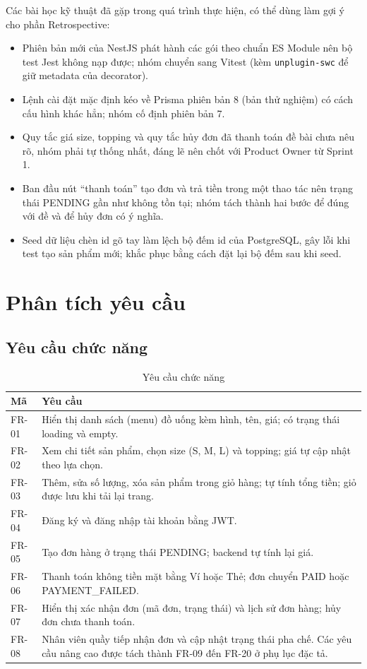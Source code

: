 \documentclass[a4paper]{article}
\begin{document}
Các bài học kỹ thuật đã gặp trong quá trình thực hiện, có thể dùng làm gợi ý cho phần Retrospective:
\begin{itemize}
	\item Phiên bản mới của NestJS phát hành các gói theo chuẩn ES Module nên bộ test Jest không nạp được; nhóm chuyển sang Vitest (kèm \texttt{unplugin-swc} để giữ metadata của decorator).
	\item Lệnh cài đặt mặc định kéo về Prisma phiên bản 8 (bản thử nghiệm) có cách cấu hình khác hẳn; nhóm cố định phiên bản 7.
	\item Quy tắc giá size, topping và quy tắc hủy đơn đã thanh toán đề bài chưa nêu rõ, nhóm phải tự thống nhất, đáng lẽ nên chốt với Product Owner từ Sprint 1.
	\item Ban đầu nút ``thanh toán'' tạo đơn và trả tiền trong một thao tác nên trạng thái PENDING gần như không tồn tại; nhóm tách thành hai bước để đúng với đề và để hủy đơn có ý nghĩa.
	\item Seed dữ liệu chèn id gõ tay làm lệch bộ đếm id của PostgreSQL, gây lỗi khi test tạo sản phẩm mới; khắc phục bằng cách đặt lại bộ đếm sau khi seed.
\end{itemize}

\newpage
\section{Phân tích yêu cầu}
\subsection{Yêu cầu chức năng}
\begin{table}[h!]
\centering
\footnotesize
\begin{tabularx}{\textwidth}{|l|X|}
\hline
\textbf{Mã} & \textbf{Yêu cầu} \\ \hline
FR-01 & Hiển thị danh sách (menu) đồ uống kèm hình, tên, giá; có trạng thái loading và empty. \\ \hline
FR-02 & Xem chi tiết sản phẩm, chọn size (S, M, L) và topping; giá tự cập nhật theo lựa chọn. \\ \hline
FR-03 & Thêm, sửa số lượng, xóa sản phẩm trong giỏ hàng; tự tính tổng tiền; giỏ được lưu khi tải lại trang. \\ \hline
FR-04 & Đăng ký và đăng nhập tài khoản bằng JWT. \\ \hline
FR-05 & Tạo đơn hàng ở trạng thái PENDING; backend tự tính lại giá. \\ \hline
FR-06 & Thanh toán không tiền mặt bằng Ví hoặc Thẻ; đơn chuyển PAID hoặc PAYMENT\_FAILED. \\ \hline
FR-07 & Hiển thị xác nhận đơn (mã đơn, trạng thái) và lịch sử đơn hàng; hủy đơn chưa thanh toán. \\ \hline
FR-08 & Nhân viên quầy tiếp nhận đơn và cập nhật trạng thái pha chế. Các yêu cầu nâng cao được tách thành FR-09 đến FR-20 ở phụ lục đặc tả. \\ \hline
\end{tabularx}
\caption{Yêu cầu chức năng}
\end{table}
\end{document}

